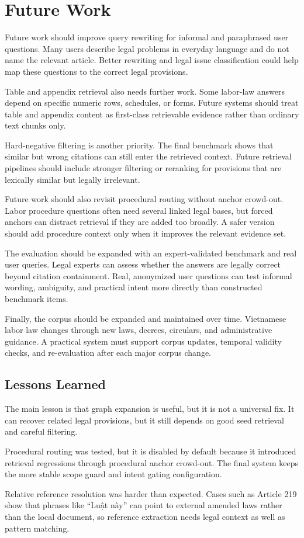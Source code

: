 \section{Future Work}
Future work should improve query rewriting for informal and paraphrased user questions. Many users describe legal problems in everyday language and do not name the relevant article. Better rewriting and legal issue classification could help map these questions to the correct legal provisions.

Table and appendix retrieval also needs further work. Some labor-law answers depend on specific numeric rows, schedules, or forms. Future systems should treat table and appendix content as first-class retrievable evidence rather than ordinary text chunks only.

Hard-negative filtering is another priority. The final benchmark shows that similar but wrong citations can still enter the retrieved context. Future retrieval pipelines should include stronger filtering or reranking for provisions that are lexically similar but legally irrelevant.

Future work should also revisit procedural routing without anchor crowd-out. Labor procedure questions often need several linked legal bases, but forced anchors can distract retrieval if they are added too broadly. A safer version should add procedure context only when it improves the relevant evidence set.

The evaluation should be expanded with an expert-validated benchmark and real user queries. Legal experts can assess whether the answers are legally correct beyond citation containment. Real, anonymized user questions can test informal wording, ambiguity, and practical intent more directly than constructed benchmark items.

Finally, the corpus should be expanded and maintained over time. Vietnamese labor law changes through new laws, decrees, circulars, and administrative guidance. A practical system must support corpus updates, temporal validity checks, and re-evaluation after each major corpus change.

\subsection*{Lessons Learned}
The main lesson is that graph expansion is useful, but it is not a universal fix. It can recover related legal provisions, but it still depends on good seed retrieval and careful filtering.

Procedural routing was tested, but it is disabled by default because it introduced retrieval regressions through procedural anchor crowd-out. The final system keeps the more stable scope guard and intent gating configuration.

Relative reference resolution was harder than expected. Cases such as Article 219 show that phrases like ``Luật này'' can point to external amended laws rather than the local document, so reference extraction needs legal context as well as pattern matching.
